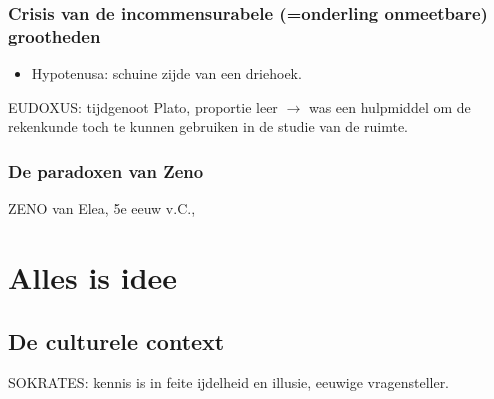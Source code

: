 \subsubsection{Crisis van de incommensurabele (=onderling onmeetbare) grootheden}
\begin{itemize}
\item Hypotenusa: schuine zijde van een driehoek.
\end{itemize}
EUDOXUS: tijdgenoot Plato, proportie leer $\rightarrow$ was een hulpmiddel om de rekenkunde toch te kunnen gebruiken in de studie van de ruimte.

\subsubsection{De paradoxen van Zeno}
ZENO van Elea, 5e eeuw v.C.,
\section{Alles is idee}

\subsection{De culturele context}
SOKRATES: kennis is in feite ijdelheid en illusie, eeuwige vragensteller.
